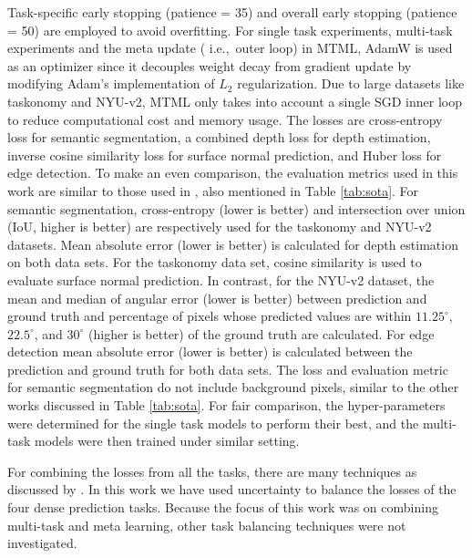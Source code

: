 \documentclass[conference]{IEEEtran}
\newcommand*{\ie}		{i.e.,\ }
\begin{document}
Task-specific early stopping (patience = 35) and overall early stopping (patience = 50) are employed to avoid overfitting. 
For single task experiments, multi-task experiments and the meta update ( \ie outer loop) in \ac{MTML}, AdamW \cite{adamw} is used as an optimizer since it decouples weight decay from gradient update by modifying Adam's \cite{adam} implementation of $L_2$ regularization. 
Due to large datasets like taskonomy and NYU-v2, \ac{MTML} only takes into account a single SGD \cite{sutskever2013importance} inner loop to reduce computational cost and memory usage.
The losses are cross-entropy loss for semantic segmentation, a combined depth loss \cite{hu2019revisiting} for depth estimation,  inverse cosine similarity loss for surface normal prediction, and Huber loss \cite{PAUL2022100218} for edge detection. 
To make an even comparison, the evaluation metrics used in this work are similar to those used in \cite{sun2020adashare, misra2016cross, liu2019end, gao2019nddr, ruder2019latent}, also mentioned in Table \ref{tab:sota}.
For semantic segmentation, cross-entropy (lower is better) and intersection over union (IoU, higher is better) are respectively used for the taskonomy and NYU-v2 datasets.
Mean absolute error (lower is better) is calculated for depth estimation on both data sets.
For the taskonomy data set, cosine similarity is used to evaluate surface normal prediction.
In contrast, for the NYU-v2 dataset, the mean and median of angular error (lower is better) between prediction and ground truth and percentage of pixels whose predicted values are within $11.25^{\circ}$, $22.5^{\circ}$, and $30^{\circ}$ \cite{sun2020adashare} (higher is better) of the ground truth are calculated. 
For edge detection mean absolute error (lower is better) is calculated between the prediction and ground truth for both data sets.
The loss and evaluation metric for semantic segmentation do not include background pixels, similar to the other works discussed in Table \ref{tab:sota}.
For fair comparison, the hyper-parameters were determined for the single task models to perform their best, and the multi-task models were then trained under similar setting. 

For combining the losses from all the tasks, there are many techniques as discussed by \cite{vandenhende2021multi}. In this work we have used uncertainty \cite{kendall2018multi} to balance the losses of the four dense prediction tasks. 
Because the focus of this work was on combining multi-task and meta learning, other task balancing techniques were not investigated.
\end{document}
